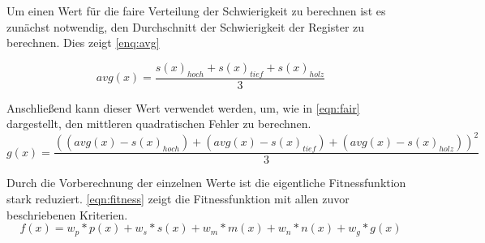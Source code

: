 Um einen Wert für die faire Verteilung der Schwierigkeit zu berechnen ist es zunächst notwendig, den Durchschnitt der
Schwierigkeit der Register zu berechnen. Dies zeigt \autoref{enq:avg}

\begin{equation}
    avg(x) = \frac{s(x)_{hoch} + s(x)_{tief} + s(x)_{holz}}{3}
    \label{enq:avg}
\end{equation}

Anschließend kann dieser Wert verwendet werden, um, wie in \autoref{eqn:fair} dargestellt,
den mittleren quadratischen Fehler zu berechnen.
\begin{equation}
    g(x) = \frac{((avg(x) - s(x)_{hoch}) + (avg(x) - s(x)_{tief}) +(avg(x) - s(x)_{holz}))^2}{3}
    \label{eqn:fair}
\end{equation}

Durch die Vorberechnung der einzelnen Werte ist die eigentliche Fitnessfunktion stark reduziert.
\autoref{eqn:fitness} zeigt die Fitnessfunktion mit allen zuvor beschriebenen Kriterien.
\begin{equation}
    f(x) = w_p * p(x) + w_s * s(x) + w_m * m(x) + w_n * n(x) +  w_g * g(x)
    \label{eqn:fitness}
\end{equation}

% 